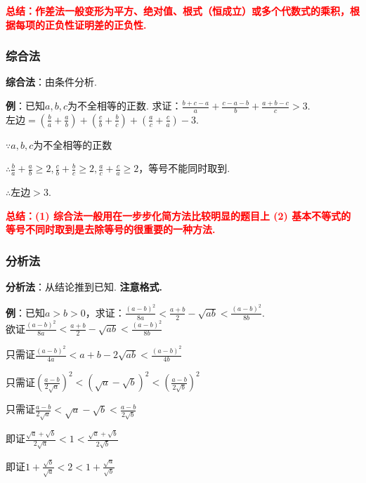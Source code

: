 \documentclass[8pt]{article}
\begin{document}
					\textcolor{red}{\textbf{总结：作差法一般变形为平方、绝对值、根式（恒成立）或多个代数式的乘积，根据每项的正负性证明差的正负性.}}

			\subsubsection{综合法}
				\textbf{综合法}：由条件分析.

				\textbf{例}：已知$a, b, c$为不全相等的正数. 求证：$\displaystyle \frac{b+c-a}{a}+\frac{c-a-b}{b}+\frac{a+b-c}{c}>3$.
					~\\

					左边$=\displaystyle\left(\frac{b}{a}+\frac{a}{b}\right)+\left(\frac{c}{b}+\frac{b}{c}\right)+\left(\frac{a}{c}+\frac{c}{a}\right)-3.$

					$\because a, b, c$为不全相等的正数

					$\therefore \frac{b}{a}+\frac{a}{b}\geq 2, \frac{c}{b}+\frac{b}{c}\geq 2, \frac{a}{c}+\frac{c}{a}\geq 2$，等号不能同时取到.

					$\therefore$左边$>3$.

					\textcolor{red}{\textbf{总结：(1) 综合法一般用在一步步化简方法比较明显的题目上 (2) 基本不等式的等号不同时取到是去除等号的很重要的一种方法.}}

			\subsubsection{分析法}
				\textbf{分析法}：从结论推到已知. \textbf{注意格式.}

				\textbf{例}：已知$a>b>0$，求证：$\displaystyle \frac{(a-b)^2}{8a}<\frac{a+b}{2}-\sqrt{ab}<\frac{(a-b)^2}{8b}.$
					~\\

					欲证$\displaystyle \frac{(a-b)^2}{8a}<\frac{a+b}{2}-\sqrt{ab}<\frac{(a-b)^2}{8b}$

					只需证$\displaystyle \frac{(a-b)^2}{4a}<a+b-2\sqrt{ab}<\frac{(a-b)^2}{4b}$

					只需证$\displaystyle \left(\frac{a-b}{2\sqrt{a}}\right)^2<\left(\sqrt{a}-\sqrt{b}\right)^2<\left(\frac{a-b}{2\sqrt{b}}\right)^2$

					只需证$\displaystyle \frac{a-b}{2\sqrt{a}}<\sqrt{a}-\sqrt{b}<\frac{a-b}{2\sqrt{b}}$

					即证$\displaystyle \frac{\sqrt{a}+\sqrt{b}}{2\sqrt{a}}<1<\frac{\sqrt{a}+\sqrt{b}}{2\sqrt{b}}$

					即证$\displaystyle 1+\frac{\sqrt{b}}{\sqrt{a}}<2<1+\frac{\sqrt{a}}{\sqrt{b}}$
\end{document}
